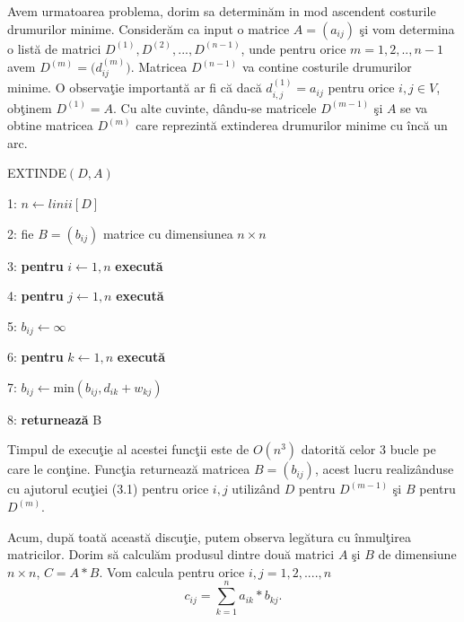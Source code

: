 \documentclass[11pt,a4paper]{report}
\begin{document}
     Avem urmatoarea problema, dorim sa determin\u am in mod ascendent costurile drumurilor minime. Consider\u am ca input o matrice $A=(a_{ij})$ \c si vom determina o list\u a de matrici $D^{(1)},D^{(2)},...,D^{(n-1)}$, unde pentru orice $m=1,2,..,n-1$ avem $D^{(m)}=\big( d_{ij}^{(m)} \big)$. Matricea $D^{(n-1)}$ va contine costurile drumurilor minime. O observa\c tie important\u a ar fi c\u a dac\u a $d_{i,j}^{(1)}=a_{ij}$ pentru orice $i,j\in V$, ob\c tinem $D^{(1)}=A$. Cu alte cuvinte, d\^ andu-se matricele $D^{(m-1)}$ \c si $A$ se va obtine matricea $D^{(m)}$ care reprezint\u a extinderea drumurilor minime cu \^ inc\u a un arc.
     
     \vspace{0.3cm}
     EXTINDE$(D,A)$
     
     \vspace{0.1cm}
     1: $n\leftarrow linii[D]$
     
     2: fie $B=(b_{ij})$ matrice cu dimensiunea $n\times n$ 
     
     3: \textbf{pentru} $i\leftarrow 1,n$ \textbf{execut\u a}
     
     4: \hspace{0.6cm}\textbf{pentru} $j\leftarrow 1,n$ \textbf{execut\u a}
     
     5:\hspace{1.2cm} $b_{ij}\leftarrow \infty$
     
     6:\hspace{1.2cm} \textbf{pentru} $k\leftarrow 1,n$ \textbf{execut\u a}
     
     7:\hspace{1.8cm} $b_{ij}\leftarrow $min$(b_{ij},d_{ik}+w_{kj})$
     
     8: \textbf{returneaz\u a} B
     \vspace{0.3cm}
     
     Timpul de execu\c tie al acestei func\c tii este de $O(n^3)$ datorit\u a celor 3 bucle pe care le con\c tine. Func\c tia returneaz\u a matricea $B=(b_{ij})$, acest lucru realiz\^ anduse cu ajutorul ecu\c tiei (3.1) pentru orice $i,j$ utiliz\^ and $D$ pentru $D^{(m-1)}$ \c si $B$ pentru $D^{(m)}$.
     
     Acum, dup\u a toat\u a aceast\u a discu\c tie, putem observa leg\u atura cu \^ inmul\c tirea matricilor. Dorim s\u a calcul\u am produsul dintre  dou\u a matrici $A$ \c si $B$ de dimensiune $n\times n$, $C=A*B$. Vom calcula pentru orice $i,j=1,2,....,n$
     \begin{equation*}
     c_{ij}=\sum_{k=1}^{n} a_{ik}*b_{kj}.
     \end{equation*}
     
\end{document}
